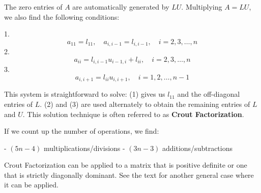 The zero entries of $A$ are automatically generated by $LU$. Multiplying
$A = LU$, we also find the following conditions:

1. \[ a_{11} = l_{11}, \quad a_{i,i-1} = l_{i,i-1}, \quad i = 2,3,\dots,n \]
2. \[ a_{ii} = l_{i,i-1} u_{i-1,i} + l_{ii}, \quad i = 2,3,\dots,n \]
3. \[ a_{i,i+1} = l_{ii} u_{i,i+1}, \quad i = 1,2,\dots,n-1 \]

This system is straightforward to solve: (1) gives us $l_{11}$ and the 
off-diagonal entries of $L$. (2) and (3) are used alternately to obtain 
the remaining entries of $L$ and $U$. This solution technique is often referred
to as \textbf{Crout Factorization}.

If we count up the number of operations, we find:

- $(5n - 4)$ multiplications/divisions
- $(3n - 3)$ additions/subtractions

Crout Factorization can be applied to a matrix that is positive definite or one
that is strictly diagonally dominant. See the text for another general case 
where it can be applied.


